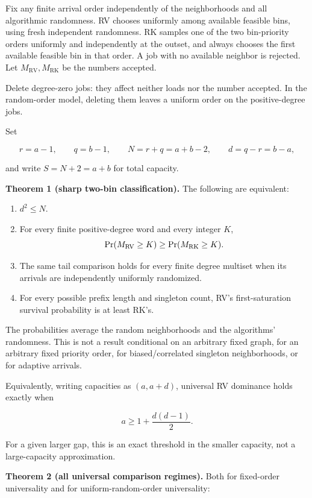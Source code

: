Fix any finite arrival order independently of the neighborhoods and all algorithmic randomness. RV chooses uniformly among available feasible bins, using fresh independent randomness. RK samples one of the two bin-priority orders uniformly and independently at the outset, and always chooses the first available feasible bin in that order. A job with no available neighbor is rejected. Let \(M_{\mathrm{RV}},M_{\mathrm{RK}}\) be the numbers accepted.

Delete degree-zero jobs: they affect neither loads nor the number accepted. In the random-order model, deleting them leaves a uniform order on the positive-degree jobs.

Set

\[
r=a-1,\qquad q=b-1,\qquad N=r+q=a+b-2,\qquad d=q-r=b-a,
\]

and write \(S=N+2=a+b\) for total capacity.

\textbf{Theorem 1 (sharp two-bin classification).} The following are equivalent:

\begin{enumerate}
\def\labelenumi{\arabic{enumi}.}
\tightlist
\item
  \(d^2 \le  N\).
\item
  For every finite positive-degree word and every integer \(K\), \[
  \Pr(M_{\rm RV}\ge K)\ge\Pr(M_{\rm RK}\ge K).
  \]
\item
  The same tail comparison holds for every finite degree multiset when its arrivals are independently uniformly randomized.
\item
  For every possible prefix length and singleton count, RV's first-saturation survival probability is at least RK's.
\end{enumerate}

The probabilities average the random neighborhoods and the algorithms' randomness. This is not a result conditional on an arbitrary fixed graph, for an arbitrary fixed priority order, for biased/correlated singleton neighborhoods, or for adaptive arrivals.

Equivalently, writing capacities as \((a,a+d)\), universal RV dominance holds exactly when

\[
a\ge 1+\frac{d(d-1)}2.
\]

For a given larger gap, this is an exact threshold in the smaller capacity, not a large-capacity approximation.

\textbf{Theorem 2 (all universal comparison regimes).} Both for fixed-order universality and for uniform-random-order universality:

